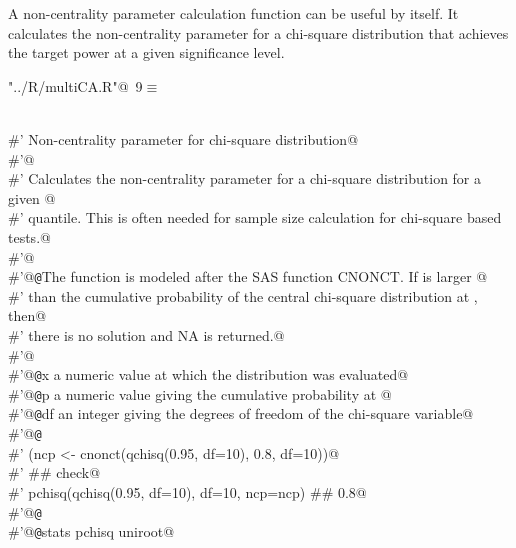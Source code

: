 \documentclass[reqno]{amsart}
\renewcommand{\NWtarget}[2]{\hypertarget{#1}{#2}}
\begin{document}
A non-centrality parameter calculation function can be useful by itself. It calculates the non-centrality parameter for a chi-square distribution that achieves the target power at a given significance level.

\begin{flushleft} \small\label{scrap14}\raggedright\small
\NWtarget{nuweb9}{} \verb@"../R/multiCA.R"@\nobreak\ {\footnotesize {9}}$\equiv$
\vspace{-1ex}
\begin{list}{}{} \item
\mbox{}\verb@@\\
\mbox{}\verb@#' Non-centrality parameter for chi-square distribution@\\
\mbox{}\verb@#'@\\
\mbox{}\verb@#' Calculates the non-centrality parameter for a chi-square distribution for a given @\\
\mbox{}\verb@#' quantile. This is often needed for sample size calculation for chi-square based tests.@\\
\mbox{}\verb@#'@\\
\mbox{}\verb@#'@{\tt @}\verb@details The function is modeled after the SAS function CNONCT. If  is larger @\\
\mbox{}\verb@#' than the cumulative probability of the central chi-square distribution at , then@\\
\mbox{}\verb@#' there is no solution and NA is returned.@\\
\mbox{}\verb@#'@\\
\mbox{}\verb@#'@{\tt @}\verb@param x a numeric value at which the distribution was evaluated@\\
\mbox{}\verb@#'@{\tt @}\verb@param p a numeric value giving the cumulative probability at @\\
\mbox{}\verb@#'@{\tt @}\verb@param df an integer giving the degrees of freedom of the chi-square variable@\\
\mbox{}\verb@#'@{\tt @}\verb@examples@\\
\mbox{}\verb@#' (ncp <- cnonct(qchisq(0.95, df=10), 0.8, df=10))@\\
\mbox{}\verb@#' ## check@\\
\mbox{}\verb@#' pchisq(qchisq(0.95, df=10), df=10, ncp=ncp)  ## 0.8@\\
\mbox{}\verb@#'@{\tt @}\verb@export@\\
\mbox{}\verb@#'@{\tt @}\verb@importFrom stats pchisq uniroot@\\

\end{list}
\end{flushleft}
\end{document}
